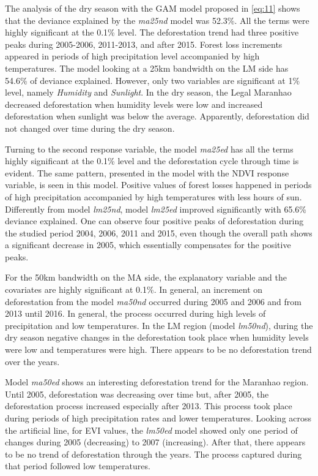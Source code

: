 The analysis of the dry season with the GAM model proposed in \ref{eq:11} shows that the deviance explained by the \textit{ma25nd} model was 52.3\%. All the terms were highly significant at the 0.1\% level. The deforestation trend had three positive peaks during 2005-2006, 2011-2013, and after 2015. Forest loss increments appeared in periods of high precipitation level accompanied by high temperatures. The model looking at a 25km bandwidth on the LM side has 54.6\% of deviance explained. However, only two variables are significant at 1\% level, namely \textit{Humidity} and \textit{Sunlight}. In the dry season, the Legal Maranhao decreased deforestation when humidity levels were low and increased deforestation when sunlight was below the average. Apparently, deforestation did not changed over time during the dry season. 

Turning to the second response variable, the model \textit{ma25ed} has all the terms highly significant at the 0.1\% level and the deforestation cycle through time is evident. The same pattern, presented in the model with the NDVI response variable, is seen in this model. Positive values of forest losses happened in periods of high precipitation accompanied by high temperatures with less hours of sun. Differently from model \textit{lm25nd}, model \textit{lm25ed} improved significantly with 65.6\% deviance explained. One can observe four positive peaks of deforestation during the studied period 2004, 2006, 2011 and 2015, even though the overall path shows a significant decrease in 2005, which essentially compensates for the positive peaks. 

For the 50km bandwidth on the MA side, the explanatory variable and the covariates are highly significant at 0.1\%. In general, an increment on deforestation from the model \textit{ma50nd} occurred during 2005 and 2006 and from 2013 until 2016. In general, the process occurred during high levels of precipitation and low temperatures. In the LM region (model \textit{lm50nd}), during the dry season negative changes in the deforestation  took place when humidity levels were low and temperatures were high. There appears to be no deforestation trend over the years.  

Model \textit{ma50ed} shows an interesting deforestation trend for the Maranhao region. Until 2005, deforestation was decreasing over time but, after 2005, the deforestation process increased especially after 2013. This process took place during periods of high precipitation rates and lower temperatures. Looking across the artificial line, for EVI values, the \textit{lm50ed} model showed only one period of changes during 2005 (decreasing) to 2007 (increasing). After that, there appears to be no trend of deforestation through the years. The process captured during that period followed low temperatures.  


